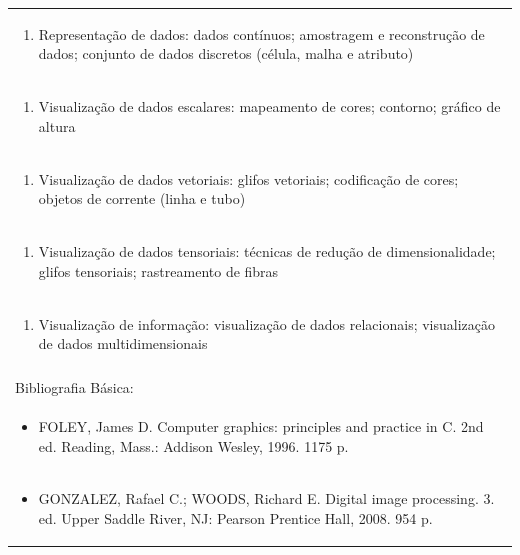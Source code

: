 \documentclass[11pt]{article}
\begin{document}
\begin{center}
\begin{longtable}{|p{4cm}|p{4cm}|p{4cm}|p{4cm}|}
\multicolumn{4}{|p{\dimexpr 16cm + 6\tabcolsep\relax}|}{\begin{enumerate}[start=2]\item Representação de dados: dados contínuos; amostragem e reconstrução de dados; conjunto de dados discretos (célula, malha e atributo)\end{enumerate}}\\
\multicolumn{4}{|p{\dimexpr 16cm + 6\tabcolsep\relax}|}{\begin{enumerate}[start=3]\item Visualização de dados escalares: mapeamento de cores; contorno; gráfico de altura\end{enumerate}}\\
\multicolumn{4}{|p{\dimexpr 16cm + 6\tabcolsep\relax}|}{\begin{enumerate}[start=4]\item Visualização de dados vetoriais: glifos vetoriais; codificação de cores; objetos de corrente (linha e tubo)\end{enumerate}}\\
\multicolumn{4}{|p{\dimexpr 16cm + 6\tabcolsep\relax}|}{\begin{enumerate}[start=5]\item Visualização de dados tensoriais: técnicas de redução de dimensionalidade; glifos tensoriais; rastreamento de fibras\end{enumerate}}\\
\multicolumn{4}{|p{\dimexpr 16cm + 6\tabcolsep\relax}|}{\begin{enumerate}[start=6]\item Visualização de informação: visualização de dados relacionais; visualização de dados multidimensionais\end{enumerate}}\\
\multicolumn{4}{|p{\dimexpr 16cm + 6\tabcolsep\relax}|}{}\\
\hline
\multicolumn{4}{|p{16cm}|}{Bibliografia Básica:}\\*
\multicolumn{4}{|p{\dimexpr 16cm + 6\tabcolsep\relax}|}{\begin{itemize}\item FOLEY, James D. Computer graphics: principles and practice in C. 2nd ed. Reading, Mass.: Addison Wesley, 1996. 1175 p.\end{itemize}}\\
\multicolumn{4}{|p{\dimexpr 16cm + 6\tabcolsep\relax}|}{\begin{itemize}\item GONZALEZ, Rafael C.; WOODS, Richard E. Digital image processing. 3. ed. Upper Saddle River, NJ: Pearson Prentice Hall, 2008. 954 p.\end{itemize}}\\

\end{longtable}
\end{center}
\end{document}
